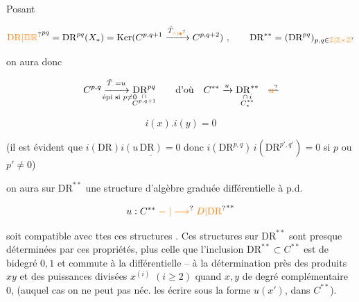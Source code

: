 
Posant

\[
\unsure{\mathrm{DR}|\mathbb D\mathbb R}^{pq}=\mathrm{DR}^{pq}(X_*)=\operatorname{Ker}(C^{p,q+1}\xrightarrow{\bar T_{\unsure{\wedge|\bullet}}}C^{p,q+2})\ ,\qquad
\mathrm{DR}^{**}=(\mathrm{DR}^{pq})_{p,q\in\unsure{\mathbb Z|\mathbb Z\times\mathbb Z}}
\]

on aura donc

\[
\underset{\text{épi si }p\ne0}{\smash[b]{\mathstrut C^{p,q}\xrightarrow{\bar T_.\,=u}\underset{\substack{\cap\\C^{p,q+1}}}{\mathrm{DR}^{pq}}}}\qquad
\text{d'où}\quad C^{**}\xrightarrow{u}\underset{\substack{\cap\,i\\ C_*^{**}}}{\mathrm{DR}^{**}}\quad\deleted{\unsure{u}}
\]


\[
i(x).i(y)=0\tag*{(C)}
\]

(il est évident que $i(\mathrm{DR})\underline{i(u\,\mathrm{DR})=0}$ donc $i(\mathrm{DR}^{p,q})\,i(\mathrm{DR}^{p',q'})=0$ si $p$ ou $p'\ne0$)


 on aura sur $\mathrm{DR}^{**}$ une structure d'algèbre graduée différentielle à p.d.  

\[
u:C^{**}\mathrel{\unsure{\relbar|\longrightarrow}}\unsure{D|\mathrm{DR}}^{**}
\]

soit compatible avec ttes ces structures . Ces structures sur $\mathrm{DR}^{**}$ sont presque déterminées par ces propriétés, plus celle que l'inclusion $\mathrm{DR}^{**}\subset C^{**}$ est de bidegré $0,1$ et commute à la différentielle -- à la détermination près des produits $xy$  et des puissances divisées $x^{(i)}$ $(i\geq2)$ quand $x,y$  de degré complémentaire $0$, (auquel cas on ne peut pas néc. les écrire sous la forme $u(x')$,  dans $C^{**}$).

